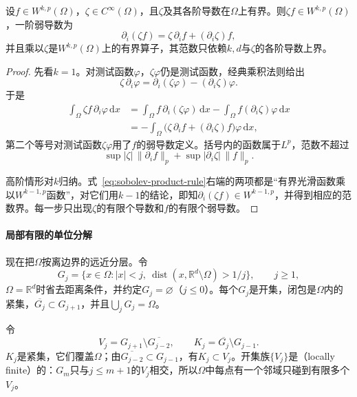 \begin{lemma}[光滑函数的乘积法则]
\label{lem:sobolev-product-rule}
设$f\in W^{k,p}(\Omega)$，$\zeta\in C^\infty(\Omega)$，且$\zeta$及其各阶导数在$\Omega$上有界。则$\zeta f\in W^{k,p}(\Omega)$，一阶弱导数为
\begin{equation}
\partial_i(\zeta f)=\zeta\,\partial_if+(\partial_i\zeta)f ,
\label{eq:sobolev-product-rule}
\end{equation}
并且乘以$\zeta$是$W^{k,p}(\Omega)$上的有界算子，其范数只依赖$k,d$与$\zeta$的各阶导数上界。
\end{lemma}

\begin{proof}
先看$k=1$。对测试函数$\varphi$，$\zeta\varphi$仍是测试函数，经典乘积法则给出
\[
\zeta\,\partial_i\varphi=\partial_i(\zeta\varphi)-(\partial_i\zeta)\varphi .
\]
于是
\[
\begin{aligned}
\int_\Omega\zeta f\,\partial_i\varphi\,\mathrm dx
&=\int_\Omega f\,\partial_i(\zeta\varphi)\,\mathrm dx-\int_\Omega f(\partial_i\zeta)\varphi\,\mathrm dx\\
&=-\int_\Omega\bigl(\zeta\,\partial_if+(\partial_i\zeta)f\bigr)\varphi\,\mathrm dx ,
\end{aligned}
\]
第二个等号对测试函数$\zeta\varphi$用了$f$的弱导数定义。括号内的函数属于$L^p$，范数不超过
\[
\sup|\zeta|\,\lVert\partial_if\rVert_p+\sup|\partial_i\zeta|\,\lVert f\rVert_p .
\]

高阶情形对$k$归纳。式~\eqref{eq:sobolev-product-rule}右端的两项都是“有界光滑函数乘以$W^{k-1,p}$函数”，对它们用$k-1$的结论，即知$\partial_i(\zeta f)\in W^{k-1,p}$，并得到相应的范数界。每一步只出现$\zeta$的有限个导数和$f$的有限个弱导数。
\end{proof}

\paragraph{局部有限的单位分解}
现在把$\Omega$按离边界的远近分层。令
\[
G_j=\{x\in\Omega:|x|<j,\ \operatorname{dist}(x,\mathbb R^d\setminus\Omega)>1/j\},\qquad j\geq1,
\]
$\Omega=\mathbb R^d$时省去距离条件，并约定$G_j=\varnothing$（$j\leq0$）。每个$G_j$是开集，闭包是$\Omega$内的紧集，$\overline{G_j}\subset G_{j+1}$，并且$\bigcup_jG_j=\Omega$。

令
\[
V_j=G_{j+1}\setminus\overline{G_{j-2}},\qquad K_j=\overline{G_j}\setminus G_{j-1}.
\]
$K_j$是紧集，它们覆盖$\Omega$；由$\overline{G_{j-2}}\subset G_{j-1}$，有$K_j\subset V_j$。开集族$\{V_j\}$是（locally finite）的：$G_m$只与$j\leq m+1$的$V_j$相交，所以$\Omega$中每点有一个邻域只碰到有限多个$V_j$。

